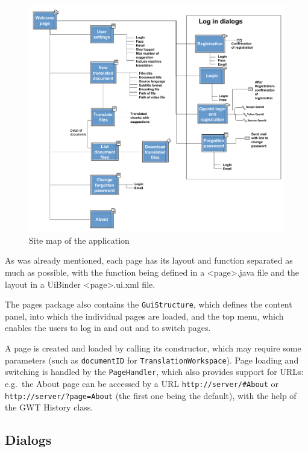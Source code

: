 \begin{figure}
\begin{center}
\includegraphics[scale=0.4]{figures/sitemap.pdf}
\end{center}
\caption{Site map of the application}
\label{fig:sitemap}
\end{figure}

As was already mentioned, each page has its layout and function separated as much as possible, with the function being defined in a <page>.java file and the layout in a UiBinder <page>.ui.xml file.

The pages package also contains the {\tt GuiStructure}, which defines the content panel, into which the individual pages are loaded, and the top menu, which enables the users to log in and out and to switch pages.

A page is created and loaded by calling its constructor, which may require some parameters (such as {\tt documentID} for {\tt TranslationWorkspace}).
Page loading and switching is handled by the {\tt PageHandler}, which also provides support for URLs: e.g.\ the About page can be accessed by a URL {\tt http://server/\#About} or {\tt http://server/?page=About} (the first one being the default), with the help of the GWT History class.

\subsection{Dialogs}

